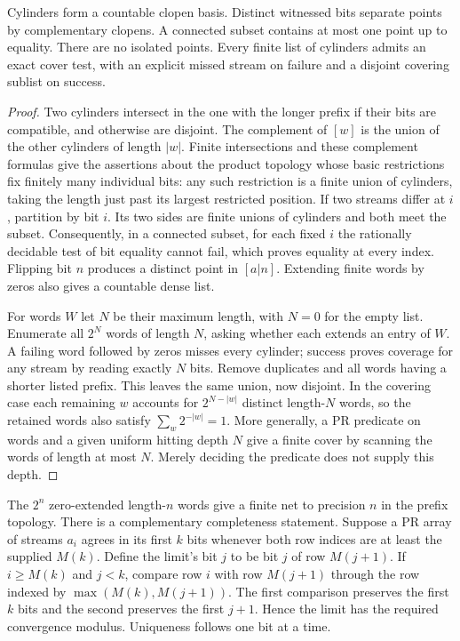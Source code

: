 \begin{theorem}\label{idx-cantor17}
Cylinders form a countable clopen basis. Distinct witnessed bits separate
points by complementary clopens. A connected subset contains at most one
point up to equality. There are no isolated points. Every finite list of
cylinders admits an exact cover test, with an explicit missed stream on
failure and a disjoint covering sublist on success.
\end{theorem}
\begin{proof}
Two cylinders intersect in the one with the longer prefix if their bits
are compatible, and otherwise are disjoint. The complement of $[w]$ is
the union of the other cylinders of length $|w|$. Finite intersections
and these complement formulas give the assertions about the product
topology whose basic restrictions fix finitely many individual bits:
any such restriction is a finite union of cylinders, taking the length
just past its largest restricted position. If two streams differ at $i$,
partition by bit $i$. Its two sides are finite unions of cylinders and
both meet the subset. Consequently, in a connected subset, for each fixed
$i$ the rationally decidable test of bit equality cannot fail, which proves
equality at every index. Flipping bit $n$ produces a distinct point in
$[a|n]$. Extending finite words by zeros also gives a countable dense list.

For words $W$ let $N$ be their maximum length, with $N=0$ for the empty
list. Enumerate all $2^N$ words of length $N$, asking whether each extends
an entry of $W$. A failing word followed by zeros misses every cylinder;
success proves coverage for any stream by reading exactly $N$ bits. Remove
duplicates and all words having a shorter listed prefix. This leaves the
same union, now disjoint. In the covering case each remaining $w$ accounts
for $2^{N-|w|}$ distinct length-$N$ words, so the retained words also
satisfy $\sum_w2^{-|w|}=1$. More generally, a PR predicate on words and a
given uniform hitting depth $N$ give a finite cover by scanning the words
of length at most $N$. Merely deciding the predicate does not supply this
depth.
\end{proof}

The $2^n$ zero-extended length-$n$ words give a finite net to precision
$n$ in the prefix topology. There is a complementary completeness
statement. Suppose a PR array of streams $a_i$ agrees in its first $k$ bits
whenever both row indices are at least the supplied $M(k)$. Define the
limit's bit $j$ to be bit $j$ of row $M(j+1)$. If $i\ge M(k)$ and $j<k$,
compare row $i$ with row $M(j+1)$ through the row indexed by
$\max(M(k),M(j+1))$. The first comparison preserves the first $k$ bits and
the second preserves the first $j+1$. Hence the limit has the required
convergence modulus. Uniqueness follows one bit at a time.

